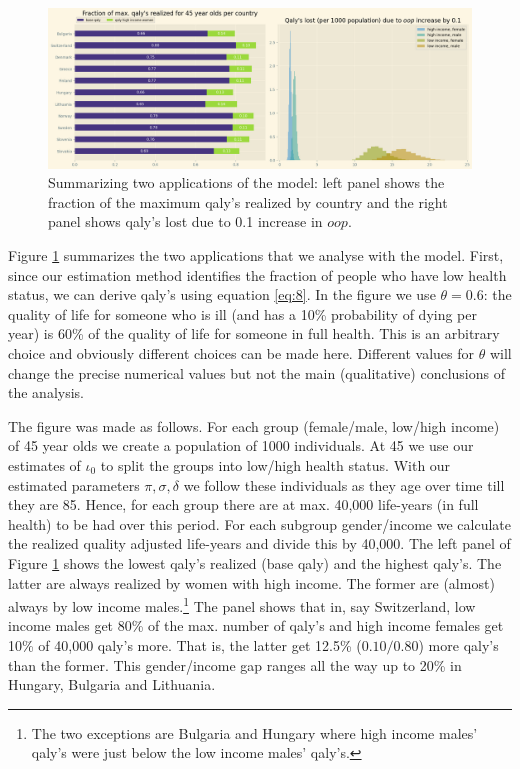 \documentclass[a4paper,12pt]{article}
\begin{document}
\begin{figure}[htbp]
\centering
\includegraphics[width=.9\linewidth]{./figures/summary_two_applications.png}
\caption{\label{fig:applications}Summarizing two applications of the model: left panel shows the fraction of the maximum qaly's realized by country and the right panel shows qaly's lost due to 0.1 increase in \(oop\).}
\end{figure}

Figure \ref{fig:applications} summarizes the two applications that we analyse with the model. First, since our estimation method identifies the fraction of people who have low health status, we can derive qaly's using equation \eqref{eq:8}. In the figure we use \(\theta=0.6\): the quality of life for someone who is ill (and has a 10\% probability of dying per year) is 60\% of the quality of life for someone in full health. This is an arbitrary choice and obviously different choices can be made here. Different values for \(\theta\) will change the precise numerical values but not the main (qualitative) conclusions of the analysis.

The figure was made as follows. For each group (female/male, low/high income) of 45 year olds we create a population of 1000 individuals. At 45 we use our estimates of \(\iota_0\) to split the groups into low/high health status. With our estimated parameters \(\pi,\sigma,\delta\) we follow these individuals as they age over time till they are 85. Hence, for each group there are at max. 40,000 life-years (in full health) to be had over this period. For each subgroup gender/income we calculate the realized quality adjusted life-years and divide this by 40,000. The left panel of Figure \ref{fig:applications} shows the lowest qaly's realized (base qaly) and the highest qaly's. The latter are always realized by women with high income. The former are (almost) always by low income males.\footnote{The two exceptions are Bulgaria and Hungary where high income males' qaly's were just below the low income males' qaly's.} The panel shows that in, say Switzerland, low income males get 80\% of the max. number of qaly's and high income females get 10\% of 40,000 qaly's more. That is, the latter get 12.5\% (\(0.10/0.80\)) more qaly's than the former. This gender/income gap ranges all the way up to 20\% in Hungary, Bulgaria and Lithuania.
\end{document}
